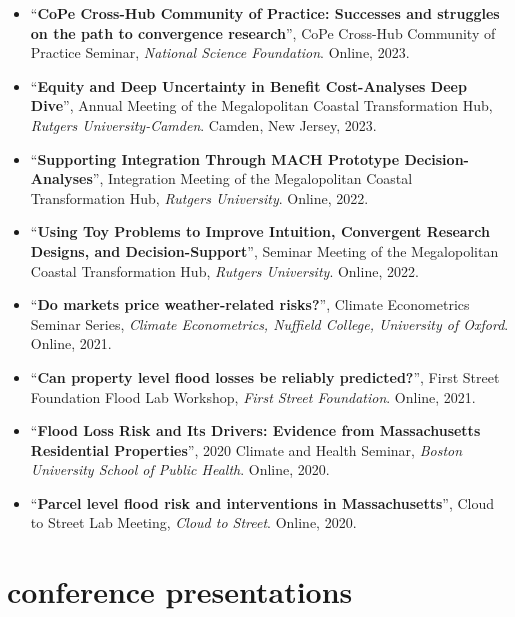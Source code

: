 \documentclass[10pt,oneside]{article}
\begin{document}
\begin{itemize}[label={}]
  \item \enquote{\textbf{CoPe Cross-Hub Community of Practice: Successes and struggles on the path to convergence research}}, CoPe Cross-Hub Community of Practice Seminar,  \textit{National Science Foundation}. Online, 2023.
  
  \item \enquote{\textbf{Equity and Deep Uncertainty in Benefit Cost-Analyses Deep Dive}}, Annual Meeting of the Megalopolitan Coastal Transformation Hub,  \textit{Rutgers University-Camden}. Camden, New Jersey, 2023.
  
  \item \enquote{\textbf{Supporting Integration Through MACH Prototype Decision-Analyses}}, Integration Meeting of the Megalopolitan Coastal Transformation Hub,  \textit{Rutgers University}. Online, 2022.
  
  \item \enquote{\textbf{Using Toy Problems to Improve Intuition, Convergent Research Designs, and Decision-Support}}, Seminar Meeting of the Megalopolitan Coastal Transformation Hub,  \textit{Rutgers University}. Online, 2022.
  
  \item \enquote{\textbf{Do markets price weather-related risks?}}, Climate Econometrics Seminar Series,  \textit{Climate Econometrics, Nuffield College, University of Oxford}. Online, 2021.
  
  \item \enquote{\textbf{Can property level flood losses be reliably predicted?}}, First Street Foundation Flood Lab Workshop,  \textit{First Street Foundation}. Online, 2021.
  
  \item \enquote{\textbf{Flood Loss Risk and Its Drivers: Evidence from Massachusetts Residential Properties}}, 2020 Climate and Health Seminar,  \textit{Boston University School of Public Health}. Online, 2020.
  
  \item \enquote{\textbf{Parcel level flood risk and interventions in Massachusetts}}, Cloud to Street Lab Meeting,  \textit{Cloud to Street}. Online, 2020.
  
\end{itemize}

\section{conference presentations}
\end{document}
